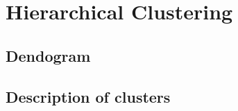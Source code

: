 

\section{Hierarchical Clustering}%
\label{sec:hierarchical_clustering}



\subsection{Dendogram}%
\label{sub:dendogram}





\subsection{Description of clusters}%
\label{sub:description_of_clusters}



